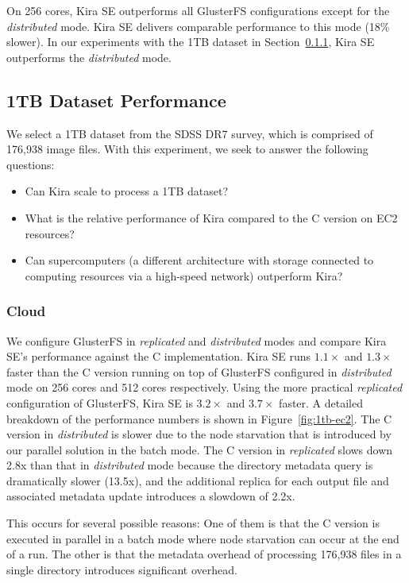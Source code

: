\documentclass[conference]{IEEEtran}
\begin{document}
On 256 cores, Kira SE outperforms all GlusterFS configurations except for the \emph{distributed}
mode. Kira SE delivers comparable performance to this mode (18\% slower). In our
experiments with the 1TB dataset in Section~\ref{sec:1TB-EC2}, Kira SE outperforms
the \emph{distributed} mode.

\subsection{1TB Dataset Performance}
\label{sec:Performance-1TB}

We select a 1TB dataset from the SDSS DR7 survey, which is comprised of 176,938 image files. 
With this experiment, we seek to answer the following questions: 

\begin{itemize}
\item Can Kira scale to process a 1TB dataset?
\item What is the relative performance of Kira compared to the C version on EC2 resources?
\item Can supercomputers (a different architecture with storage connected to computing
resources via a high-speed network) outperform Kira?
\end{itemize}

\subsubsection{Cloud}
\label{sec:1TB-EC2}

We configure GlusterFS in \emph{replicated} and \emph{distributed} modes and compare Kira
SE's performance against the C implementation. Kira SE runs $1.1\times$ and $1.3\times$ faster than the C version running on top of
GlusterFS configured in \emph{distributed} mode on 256 cores and 512 cores respectively. 
Using the more practical \emph{replicated} configuration of GlusterFS, Kira SE
is $3.2\times$ and $3.7\times$ faster. A detailed breakdown of the performance numbers is shown in Figure~\ref{fig:1tb-ec2}.
The C version in \emph{distributed} is slower due to the node starvation that is introduced by our parallel solution in the batch mode.
The C version in \emph{replicated} slows down 2.8x than that in \emph{distributed} mode because the directory metadata query
is dramatically slower (13.5x), and the additional replica for each output file and associated metadata update introduces a slowdown
of 2.2x.

This occurs for several possible reasons: One of them is that the C version is executed in parallel in a batch mode 
where node starvation can occur at the end of a run. The other is that the metadata overhead of processing 176,938 files in a 
single directory introduces significant overhead.
\end{document}
